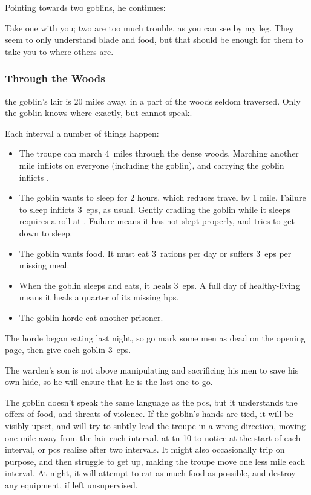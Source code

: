 \documentclass[10pt,twoside]{book}
\begin{document}
Pointing towards two goblins, he continues:

\begin{speechtext}
  Take one with you; two are too much trouble, as you can see by my leg.
  They seem to only understand blade and food, but that should be enough for them to take you to where others are.
\end{speechtext}

\subsubsection{Through the Woods}
the goblin's lair is 20 miles away, in a part of the woods seldom traversed.
Only the goblin knows where exactly, but cannot speak.

%
Each \gls{interval} a number of things happen:

\begin{itemize}
  \item
  The troupe can march 4~miles through the dense woods.
  Marching another mile inflicts  on everyone (including the goblin), and carrying the goblin inflicts .
  \item
  The goblin wants to sleep for 2 hours, which reduces travel by 1 mile.
  Failure to sleep inflicts 3~\glspl{ep}, as usual.
  Gently cradling the goblin while it sleeps requires a  roll at \tn[8].
  Failure means it has not slept properly, and tries to get down to sleep.
  \item
  The goblin wants food.
  It must eat 3~\glspl{ration} per day or suffers 3~\glspl{ep} per missing meal.
  \item
  When the goblin sleeps and eats, it heals 3~\glspl{ep}.
  A full day of healthy-living means it heals a quarter of its missing \glspl{hp}.
  \item
  The goblin horde eat another prisoner.
\end{itemize}

The horde began eating last night, so go mark some men as dead on the opening page, then give each goblin 3~\glspl{ep}.

The \gls{warden}'s son is not above manipulating and sacrificing his men to save his own hide, so he will ensure that he is the last one to go.

The goblin doesn't speak the same language as the \glspl{pc}, but it understands the offers of food, and threats of violence.
If the goblin's hands are tied, it will be visibly upset, and will try to subtly lead the troupe in a wrong direction, moving one mile away from the lair each \gls{interval}.
 at \gls{tn} 10 to notice at the start of each \gls{interval}, or \glspl{pc} realize after two \glspl{interval}.
It might also occasionally trip on purpose, and then struggle to get up, making the troupe move one less mile each \gls{interval}.
At night, it will attempt to eat as much food as possible, and destroy any equipment, if left unsupervised.
\end{document}
